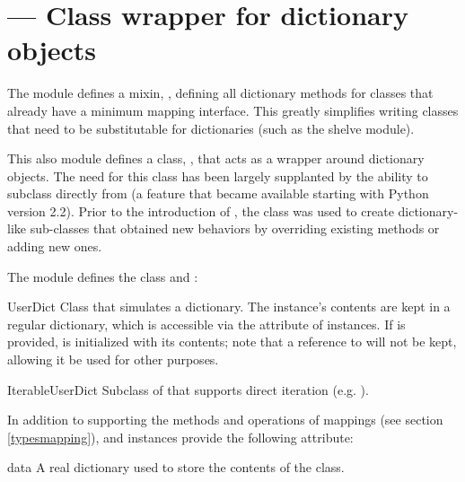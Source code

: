 \section{ ---
         Class wrapper for dictionary objects}



The module defines a mixin,  , defining all dictionary
methods for classes that already have a minimum mapping interface.  This
greatly simplifies writing classes that need to be substitutable for
dictionaries (such as the shelve module).

This also module defines a class, , that acts as a wrapper
around dictionary objects.  The need for this class has been largely
supplanted by the ability to subclass directly from  (a feature
that became available starting with Python version 2.2).  Prior to the
introduction of , the  class was used to
create dictionary-like sub-classes that obtained new behaviors by overriding
existing methods or adding new ones.

The  module defines the  class
and :

\begin{classdesc}{UserDict}{}
Class that simulates a dictionary.  The instance's
contents are kept in a regular dictionary, which is accessible via the
 attribute of  instances.  If
 is provided,  is initialized with its
contents; note that a reference to  will not be kept, 
allowing it be used for other purposes. 
\end{classdesc}

\begin{classdesc}{IterableUserDict}{}
Subclass of  that supports direct iteration (e.g.
).
\end{classdesc}

In addition to supporting the methods and operations of mappings (see
section \ref{typesmapping}),  and
 instances provide the following attribute:

\begin{memberdesc}{data}
A real dictionary used to store the contents of the 
class.
\end{memberdesc}

